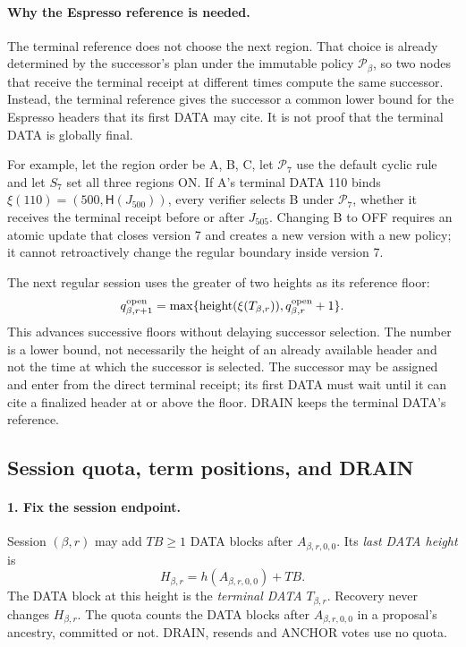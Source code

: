 \documentclass[11pt,a4paper]{article}
\newcommand{\Hash}{\mathsf H}
\newcommand{\TB}{\mathit{TB}}
\newcommand{\defterm}[1]{\textcolor{rrBlue}{\textit{#1}}}
\begin{document}
\paragraph{Why the Espresso reference is needed.}
The terminal reference does not choose the next region. That choice is
already determined by the successor's plan under the immutable policy
$\mathcal P_\beta$, so two nodes that receive the terminal receipt at
different times compute the same successor. Instead, the terminal reference gives the successor a common
lower bound for the Espresso headers that its first DATA may cite. It is
not proof that the terminal DATA is globally final.

For example, let the region order be A, B, C, let $\mathcal P_7$ use the
default cyclic rule and let $S_7$ set all three regions ON. If A's
terminal DATA 110 binds $\xi(110)=(500,\Hash(J_{500}))$, every verifier
selects B under $\mathcal P_7$, whether it receives the terminal receipt
before or after $J_{505}$. Changing B to OFF requires an atomic update
that closes version 7 and creates a new version with a new policy; it
cannot retroactively change the regular boundary inside version 7.

The next regular session uses the greater of two heights as its reference
floor:
\[
 q^{\rm open}_{\beta,r+1}
 =\max\{\operatorname{height}(\xi(T_{\beta,r})),
         q^{\rm open}_{\beta,r}+1\}.
\]
This advances successive floors without delaying successor selection.
The number is a lower bound, not necessarily the height of an already
available header and not the time at which the successor is selected.
The successor may be assigned and enter from the direct terminal receipt;
its first DATA must wait until it can cite a finalized header at or above
the floor. DRAIN keeps the terminal DATA's reference.

\subsection{Session quota, term positions, and DRAIN}
\label{sec:quota}
\paragraph{1. Fix the session endpoint.}
Session $(\beta,r)$ may add $\TB\ge1$ DATA blocks after
$A_{\beta,r,0,0}$. Its \defterm{last DATA height} is
\[
 H_{\beta,r}=h(A_{\beta,r,0,0})+\TB.
\]
The DATA block at this height is the \defterm{terminal DATA}
$T_{\beta,r}$. Recovery never changes $H_{\beta,r}$. The quota counts the
DATA blocks after $A_{\beta,r,0,0}$ in a proposal's ancestry, committed
or not. DRAIN, resends and ANCHOR votes use no quota.
\end{document}
